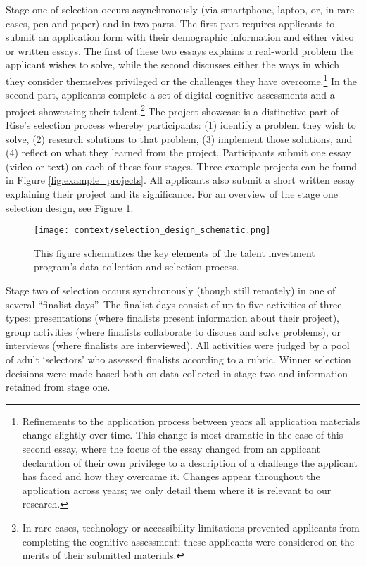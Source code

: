 Stage one of selection occurs asynchronously (via smartphone, laptop, or, in rare cases, pen and paper) and in two parts. The first part requires applicants to submit an application form with their demographic information and either video or written essays. The first of these two essays explains a real-world problem the applicant wishes to solve, while the second discusses either the ways in which they consider themselves privileged or the challenges they have overcome.\footnote{Refinements to the application process between years all application materials change slightly over time. This change is most dramatic in the case of this second essay, where the focus of the essay changed from an applicant declaration of their own privilege to a description of a challenge the applicant has faced and how they overcame it. Changes appear throughout the application across years; we only detail them where it is relevant to our research.} In the second part, applicants complete a set of digital cognitive assessments and a project showcasing their talent.\footnote{In rare cases, technology or accessibility limitations prevented applicants from completing the cognitive assessment; these applicants were considered on the merits of their submitted materials.} The project showcase is a distinctive part of Rise's selection process whereby participants: (1) identify a problem they wish to solve, (2) research solutions to that problem, (3) implement those solutions, and (4) reflect on what they learned from the project. Participants submit one essay (video or text) on each of these four stages. Three example projects can be found in Figure \ref{fig:example_projects}. All applicants also submit a short written essay explaining their project and its significance. For an overview of the stage one selection design, see Figure \ref{fig:design}.

\begin{figure}[htbp]
    \centering
    \caption{This figure schematizes the key elements of the talent investment program's data collection and selection process. }
    \texttt{[image: context/selection\_design\_schematic.png]} 
    \label{fig:design}
\end{figure}

Stage two of selection occurs synchronously (though still remotely) in one of several ``finalist days''. The finalist days consist of up to five activities of three types: presentations (where finalists present information about their project), group activities (where finalists collaborate to discuss and solve problems), or interviews (where finalists are interviewed). All activities were judged by a pool of adult `selectors' who assessed finalists according to a rubric. Winner selection decisions were made based both on data collected in stage two and information retained from stage one.

